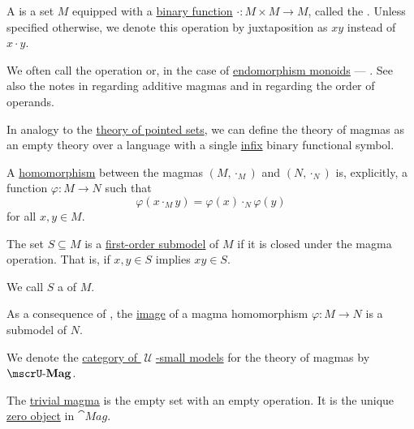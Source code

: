 \begin{definition}\label{def:magma}
  A  is a set \( M \) equipped with a \hyperref[def:multi_valued_function/arguments]{binary function} \( \cdot: M \times M \to M \), called the . Unless specified otherwise, we denote this operation by juxtaposition as \( xy \) instead of \( x \cdot y \).

  We often call the operation  or, in the case of \hyperref[def:endomorphism_monoid]{endomorphism monoids} --- . See also the notes in  regarding additive magmas and in  regarding the order of operands.

  \begin{thmenum}[series=def:magma]
     In analogy to the \hyperref[def:pointed_set/theory]{theory of pointed sets}, we can define the theory of magmas as an empty theory over a language with a single \hyperref[rem:first_order_formula_conventions/infix]{infix} binary functional symbol.

     A \hyperref[def:first_order_homomorphism]{homomorphism} between the magmas \( (M, \cdot_{M}) \) and \( (N, \cdot_{N}) \) is, explicitly, a function \( \varphi: M \to N \) such that
    \begin{equation}\label{eq:def:magma/homomorphism}
      \varphi(x \cdot_{M} y) = \varphi(x) \cdot_{N} \varphi(y)
    \end{equation}
    for all \( x, y \in M \).

     The set \( S \subseteq M \) is a \hyperref[def:first_order_substructure]{first-order submodel} of \( M \) if it is closed under the magma operation. That is, if \( x, y \in S \) implies \( xy \in S \).

    We call \( S \) a  of \( M \).

    As a consequence of , the \hyperref[def:multi_valued_function/image]{image} of a magma homomorphism \( \varphi: M \to N \) is a submodel of \( N \).

     We denote the \hyperref[def:category_of_small_first_order_models]{category of \( \mscrU \)-small models} for the theory of magmas by \( \ucat{Mag} \).

     The \hyperref[thm:substructures_form_complete_lattice/bottom]{trivial magma} is the empty set with an empty operation. It is the unique \hyperref[def:universal_objects/initial]{zero object} in \( \cat{Mag} \).


\end{thmenum}
\end{definition}
